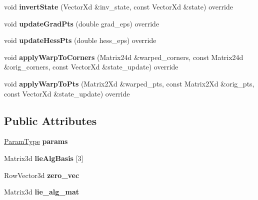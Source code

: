 \begin{DoxyCompactItemize}
\item 
\hypertarget{classLieIsometry_a0a4e28a4516261f45becd174fe0eabb4}{void {\bfseries invert\-State} (Vector\-Xd \&inv\-\_\-state, const Vector\-Xd \&state) override}\label{classLieIsometry_a0a4e28a4516261f45becd174fe0eabb4}

\item 
\hypertarget{classLieIsometry_a461fb9baedcbba5251efa306360a0346}{void {\bfseries update\-Grad\-Pts} (double grad\-\_\-eps) override}\label{classLieIsometry_a461fb9baedcbba5251efa306360a0346}

\item 
\hypertarget{classLieIsometry_aeeb4be7465453b033aa1e829f3c83036}{void {\bfseries update\-Hess\-Pts} (double hess\-\_\-eps) override}\label{classLieIsometry_aeeb4be7465453b033aa1e829f3c83036}

\item 
\hypertarget{classLieIsometry_aa450b0750a1b6de883dcf428744ada1b}{void {\bfseries apply\-Warp\-To\-Corners} (Matrix24d \&warped\-\_\-corners, const Matrix24d \&orig\-\_\-corners, const Vector\-Xd \&state\-\_\-update) override}\label{classLieIsometry_aa450b0750a1b6de883dcf428744ada1b}

\item 
\hypertarget{classLieIsometry_a97e7181038f1d32620c4d15ff6546ca8}{void {\bfseries apply\-Warp\-To\-Pts} (Matrix2\-Xd \&warped\-\_\-pts, const Matrix2\-Xd \&orig\-\_\-pts, const Vector\-Xd \&state\-\_\-update) override}\label{classLieIsometry_a97e7181038f1d32620c4d15ff6546ca8}

\end{DoxyCompactItemize}
\subsection*{Public Attributes}
\begin{DoxyCompactItemize}
\item 
\hypertarget{classLieIsometry_a6f20b54072dc9851ad1c727af9e9fd00}{\hyperlink{structLieIsometryParams}{Param\-Type} {\bfseries params}}\label{classLieIsometry_a6f20b54072dc9851ad1c727af9e9fd00}

\item 
\hypertarget{classLieIsometry_a7923d1d02134a614961f8c36d74040d2}{Matrix3d {\bfseries lie\-Alg\-Basis} \mbox{[}3\mbox{]}}\label{classLieIsometry_a7923d1d02134a614961f8c36d74040d2}

\item 
\hypertarget{classLieIsometry_aeab89a1dc3f488e980360cc3d74b2494}{Row\-Vector3d {\bfseries zero\-\_\-vec}}\label{classLieIsometry_aeab89a1dc3f488e980360cc3d74b2494}

\item 
\hypertarget{classLieIsometry_a38c148d8c3aaef9b4d72819d02187cea}{Matrix3d {\bfseries lie\-\_\-alg\-\_\-mat}}\label{classLieIsometry_a38c148d8c3aaef9b4d72819d02187cea}

\end{DoxyCompactItemize}
